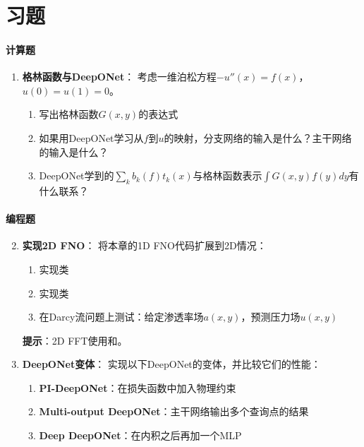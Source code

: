 \section{习题}

\paragraph{计算题}
\begin{enumerate}
    \item \textbf{格林函数与DeepONet}：
    考虑一维泊松方程$-u''(x) = f(x)$，$u(0) = u(1) = 0$。
    
    \begin{enumerate}
        \item 写出格林函数$G(x, y)$的表达式
        \item 如果用DeepONet学习从$f$到$u$的映射，分支网络的输入是什么？主干网络的输入是什么？
        \item DeepONet学到的$\sum_k b_k(f) t_k(x)$与格林函数表示$\int G(x,y) f(y) dy$有什么联系？
    \end{enumerate}
    
\end{enumerate}

\paragraph{编程题}
\begin{enumerate}
    \setcounter{enumi}{1}
    \item \textbf{实现2D FNO}：
    将本章的1D FNO代码扩展到2D情况：
    \begin{enumerate}
        \item 实现类
        \item 实现类
        \item 在Darcy流问题上测试：给定渗透率场$a(x,y)$，预测压力场$u(x,y)$
    \end{enumerate}
    
    \textbf{提示}：2D FFT使用和。
    
    \item \textbf{DeepONet变体}：
    实现以下DeepONet的变体，并比较它们的性能：
    \begin{enumerate}
        \item \textbf{PI-DeepONet}：在损失函数中加入物理约束
        \item \textbf{Multi-output DeepONet}：主干网络输出多个查询点的结果
        \item \textbf{Deep DeepONet}：在内积之后再加一个MLP
    \end{enumerate}
    
\end{enumerate}

